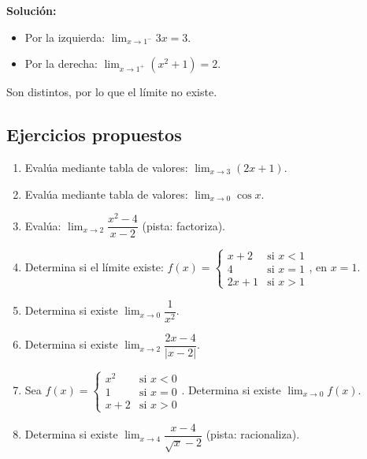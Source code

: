 \documentclass[12pt, a4paper]{article}
\begin{document}
\begin{cuadrosolucion}
  \textbf{Solución:}
  \begin{itemize}
    \item Por la izquierda: $\lim_{x \to 1^-} 3x = 3$.
    \item Por la derecha: $\lim_{x \to 1^+} (x^2 + 1) = 2$.
  \end{itemize}
  Son distintos, por lo que el límite no existe.
\end{cuadrosolucion}

\newpage

\subsection{Ejercicios propuestos}

\begin{enumerate}[leftmargin=*]
  \item \facil{} Evalúa mediante tabla de valores: $\lim_{x \to 3} (2x + 1)$.

  \item \facil{} Evalúa mediante tabla de valores: $\lim_{x \to 0} \cos x$.

  \item \facil{} Evalúa: $\lim_{x \to 2} \dfrac{x^2 - 4}{x - 2}$ (pista: factoriza).

  \item \facil{} Determina si el límite existe: $f(x) = \begin{cases} x + 2 & \text{si } x < 1 \\ 4 & \text{si } x = 1 \\ 2x + 1 & \text{si } x > 1 \end{cases}$, en $x = 1$.

  \item \medio{} Determina si existe $\lim_{x \to 0} \dfrac{1}{x^2}$.

  \item \medio{} Determina si existe $\lim_{x \to 2} \dfrac{2x - 4}{|x - 2|}$.

  \item \medio{} Sea $f(x) = \begin{cases} x^2 & \text{si } x < 0 \\ 1 & \text{si } x = 0 \\ x + 2 & \text{si } x > 0 \end{cases}$. Determina si existe $\lim_{x \to 0} f(x)$.

  \item \medio{} Determina si existe $\lim_{x \to 4} \dfrac{x - 4}{\sqrt{x} - 2}$ (pista: racionaliza).


\end{enumerate}
\end{document}
